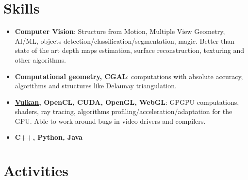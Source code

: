 \documentclass[11pt,oneside]{article}
\newcommand{\hhref}[2]{\href{#1}{\color{blue}#2}}
\begin{document}
\vspace{-9pt}
\section*{\textbf{Skills}}
\vspace{-9pt}

\begin{itemize}
    \item{\textbf{Computer Vision}}: Structure from Motion, Multiple View Geometry, AI/ML, objects detection/classification/segmentation, magic.
    Better than state of the art depth maps estimation, surface reconstruction, texturing and other algorithms.

    \item{\textbf{Computational geometry, CGAL}}: computations with absolute accuracy, algorithms and structures like Delaunay triangulation.

    \item{\textbf{\hhref{https://github.com/GPGPUCourse/GPGPUVulkan}{Vulkan}, OpenCL, CUDA, OpenGL, WebGL}}: GPGPU computations, shaders, ray tracing, algorithms profiling/acceleration/adaptation for the GPU. Able to work around bugs in video drivers and compilers.

    \item{\textbf{C++, Python, Java}}
\end{itemize}


\vspace{-9pt}
\section*{\textbf{Activities}}
\vspace{-9pt}
\end{document}
